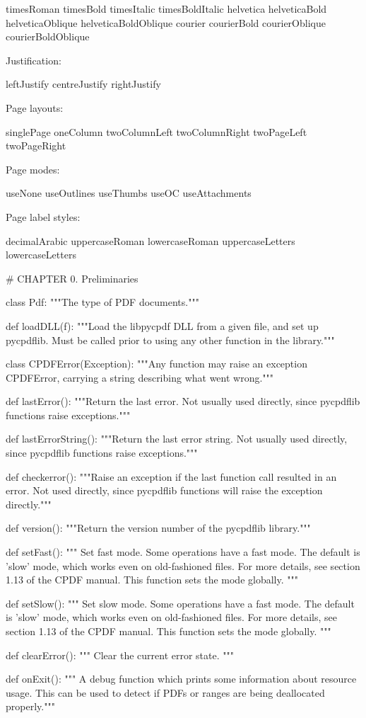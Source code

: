 timesRoman timesBold timesItalic timesBoldItalic helvetica helveticaBold
helveticaOblique helveticaBoldOblique courier courierBold courierOblique
courierBoldOblique

Justification:

leftJustify centreJustify rightJustify

Page layouts:

singlePage oneColumn twoColumnLeft twoColumnRight twoPageLeft twoPageRight

Page modes:

useNone useOutlines useThumbs useOC useAttachments

Page label styles:

decimalArabic uppercaseRoman lowercaseRoman uppercaseLetters lowercaseLetters


# CHAPTER 0. Preliminaries

class Pdf:
    """The type of PDF documents."""

def loadDLL(f):
    """Load the libpycpdf DLL from a given file, and set up pycpdflib. Must be
    called prior to using any other function in the library."""

class CPDFError(Exception):
    """Any function may raise an exception CPDFError, carrying a string
    describing what went wrong."""

def lastError():
    """Return the last error. Not usually used directly, since pycpdflib
    functions raise exceptions."""

def lastErrorString():
    """Return the last error string. Not usually used directly, since pycpdflib
    functions raise exceptions."""

def checkerror():
    """Raise an exception if the last function call resulted in an error. Not
    used directly, since pycpdflib functions will raise the exception
    directly."""

def version():
    """Return the version number of the pycpdflib library."""

def setFast():
    """ Set fast mode. Some operations have a fast mode. The default is 'slow'
    mode, which works even on old-fashioned files. For more details, see
    section 1.13 of the CPDF manual. This function sets the mode globally. """

def setSlow():
    """ Set slow mode. Some operations have a fast mode. The default is 'slow'
    mode, which works even on old-fashioned files. For more details, see
    section 1.13 of the CPDF manual. This function sets the mode globally. """

def clearError():
    """ Clear the current error state. """

def onExit():
    """ A debug function which prints some information about
    resource usage. This can be used to detect if PDFs or ranges are being
    deallocated properly."""
